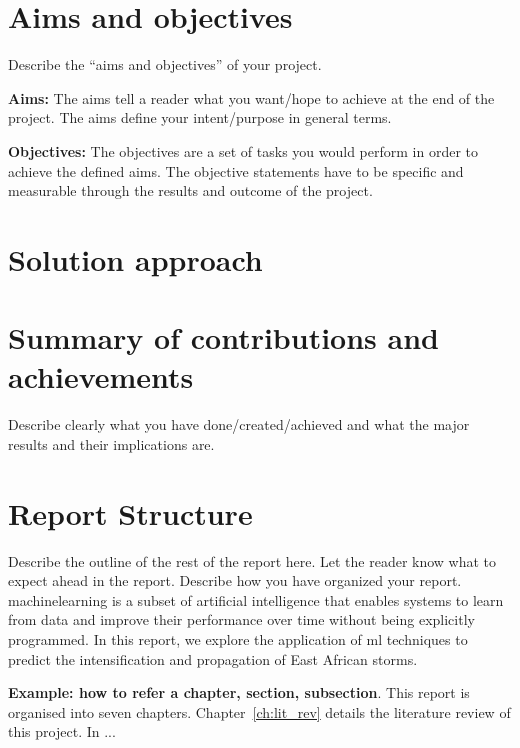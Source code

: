 \section{Aims and objectives}
\label{sec:intro_aims_obj}
Describe the ``aims and objectives'' of your project. 

\textbf{Aims:} The aims tell a reader what you want/hope to achieve at the end of the project. The  aims define your intent/purpose in general terms.  

\textbf{Objectives:} The objectives are a set of tasks you would perform in order to achieve the defined aims. The objective statements have to be specific and measurable through the results and outcome of the project.

\section{Solution approach}
\label{sec:intro_sol}

\section{Summary of contributions and achievements}
\label{sec:intro_sum_results}
Describe clearly what you have done/created/achieved and what the major results and their implications are. 


\section{Report Structure}
\label{sec:intro_org}
Describe the outline of the rest of the report here. Let the reader know what to expect ahead in the report. Describe how you have organized your report. 
\Gls{machinelearning} is a subset of artificial intelligence that enables systems to learn from data and improve their performance over time without being explicitly programmed. In this report, we explore the application of \acrshort{ml} techniques to predict the intensification and propagation of East African storms.

\textbf{Example: how to refer a chapter, section, subsection}. This report is organised into seven chapters. Chapter~\ref{ch:lit_rev} details the literature review of this project. In ...  %


